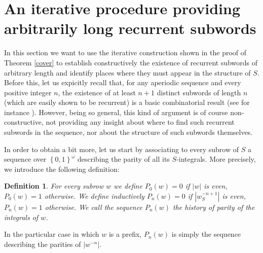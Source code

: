 \documentclass[10pt,a4paper]{article}
\newtheorem{defi}{Definition}
\begin{document}
\section{An iterative procedure providing arbitrarily long recurrent subwords}
\label{ite}
In this section we want to use the iterative construction shown in the proof of Theorem \ref{cover} to establish constructively the existence of recurrent subwords of arbitrary length and identify places where they must appear in the structure of $S$. Before this, let us expicitly recall that, for any aperiodic sequence and every positive integer $n$, the existence of at least $n+1$ distinct subwords of length $n$ (which are easily shown to be recurrent) is a basic combinatorial result (see for instance \cite{lothaire2002algebraic}).
However, being so general, this kind of argument is of course non-constructive, not providing any insight about where to find such recurrent subwords in the sequence, nor about the structure of such subwords themselves.

In order to obtain a bit more, let us start by associating to every subrow of $S$ a sequence over $\left\lbrace 0,1\right\rbrace^{\omega}$ describing the parity of all its $S$-integrals. More precisely, we introduce the following definition:

\begin{defi}
For every subrow $w$ we define $P_0(w)=0$ if $|w|$ is even, $P_0(w)=1$ otherwise. We define inductively $P_n(w)=0$ if $|w^{-n+1}_S|$ is even, $P_n(w)=1$ otherwise. We call the sequence $P_n(w)$ the \emph{history of parity} of the integrals of $w$.
\end{defi}
 In the particular case in which $w$ is a prefix, $P_n(w)$ is simply the sequence describing the parities of $|w^{-n}|$. 
\end{document}
